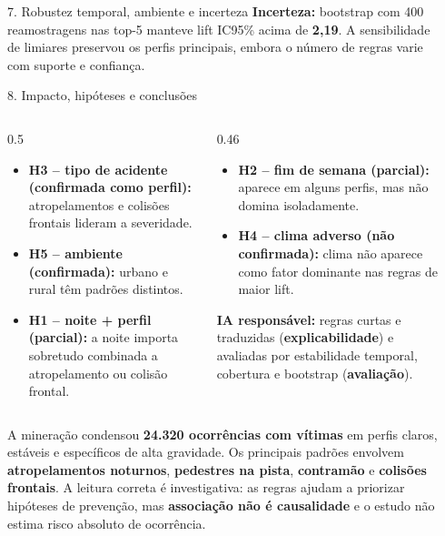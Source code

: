 \documentclass[final]{beamer}
\newlength{\sepwidth}
\newlength{\colwidth}
\newcommand{\separatorcolumn}{\begin{column}{\sepwidth}\end{column}}
\newcommand{\hl}[1]{{\color{ufmgred}\textbf{#1}}}
\begin{document}
\begin{frame}[t]
\begin{columns}[t,onlytextwidth]
\begin{column}{\colwidth}
\begin{block}{7. Robustez temporal, ambiente e incerteza}
    \vspace{0.4ex}
    \textbf{Incerteza:} bootstrap com 400 reamostragens nas top-5 manteve lift IC95\% acima
    de \hl{2,19}. A sensibilidade de limiares preservou os perfis principais, embora o
    número de regras varie com suporte e confiança.

  \end{block}

  \begin{block}{8. Impacto, hipóteses e conclusões}

    \begin{columns}[T,totalwidth=\linewidth]
      \begin{column}{0.5\linewidth}
        \begin{itemize}
          \item \textbf{H3 -- tipo de acidente (confirmada como perfil):} atropelamentos e
            colisões frontais lideram a severidade.
          \item \textbf{H5 -- ambiente (confirmada):} urbano e rural têm padrões distintos.
          \item \textbf{H1 -- noite + perfil (parcial):} a noite importa sobretudo
            combinada a atropelamento ou colisão frontal.
        \end{itemize}
      \end{column}
      \begin{column}{0.46\linewidth}
        \begin{itemize}
          \item \textbf{H2 -- fim de semana (parcial):} aparece em alguns perfis, mas não
            domina isoladamente.
          \item \textbf{H4 -- clima adverso (não confirmada):} clima não aparece como fator
            dominante nas regras de maior lift.
        \end{itemize}
        \textbf{IA responsável:} regras curtas e traduzidas (\textbf{explicabilidade}) e
        avaliadas por estabilidade temporal, cobertura e bootstrap (\textbf{avaliação}).
      \end{column}
    \end{columns}

    \vspace{0.3ex}
    A mineração condensou \textbf{24.320 ocorrências com vítimas} em perfis claros,
    estáveis e específicos de alta gravidade. Os principais padrões envolvem
    \textbf{atropelamentos noturnos}, \textbf{pedestres na pista}, \textbf{contramão} e
    \textbf{colisões frontais}. A leitura correta é investigativa: as regras ajudam a
    priorizar hipóteses de prevenção, mas \hl{associação não é causalidade} e o estudo não
    estima risco absoluto de ocorrência.

  \end{block}

\end{column}
\separatorcolumn
\end{columns}
\end{frame}
\end{document}
